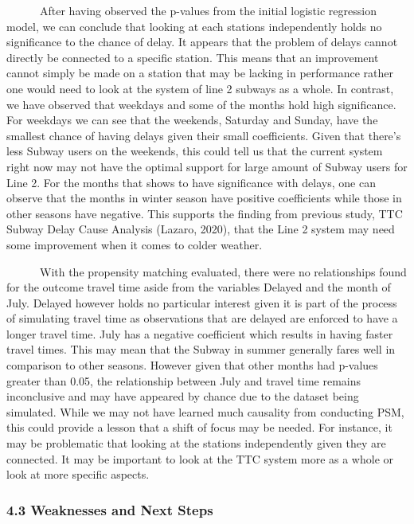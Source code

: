 \documentclass[
]{article}
\begin{document}
~~~~~~After having observed the p-values from the initial logistic
regression model, we can conclude that looking at each stations
independently holds no significance to the chance of delay. It appears
that the problem of delays cannot directly be connected to a specific
station. This means that an improvement cannot simply be made on a
station that may be lacking in performance rather one would need to look
at the system of line 2 subways as a whole. In contrast, we have
observed that weekdays and some of the months hold high significance.
For weekdays we can see that the weekends, Saturday and Sunday, have the
smallest chance of having delays given their small coefficients. Given
that there's less Subway users on the weekends, this could tell us that
the current system right now may not have the optimal support for large
amount of Subway users for Line 2. For the months that shows to have
significance with delays, one can observe that the months in winter
season have positive coefficients while those in other seasons have
negative. This supports the finding from previous study, TTC Subway
Delay Cause Analysis (Lazaro, 2020), that the Line 2 system may need
some improvement when it comes to colder weather.

~~~~~~With the propensity matching evaluated, there were no
relationships found for the outcome travel time aside from the variables
Delayed and the month of July. Delayed however holds no particular
interest given it is part of the process of simulating travel time as
observations that are delayed are enforced to have a longer travel time.
July has a negative coefficient which results in having faster travel
times. This may mean that the Subway in summer generally fares well in
comparison to other seasons. However given that other months had
p-values greater than 0.05, the relationship between July and travel
time remains inconclusive and may have appeared by chance due to the
dataset being simulated. While we may not have learned much causality
from conducting PSM, this could provide a lesson that a shift of focus
may be needed. For instance, it may be problematic that looking at the
stations independently given they are connected. It may be important to
look at the TTC system more as a whole or look at more specific aspects.

\hypertarget{weaknesses-and-next-steps}{%
\subsubsection{4.3 Weaknesses and Next
Steps}\label{weaknesses-and-next-steps}}
\end{document}
